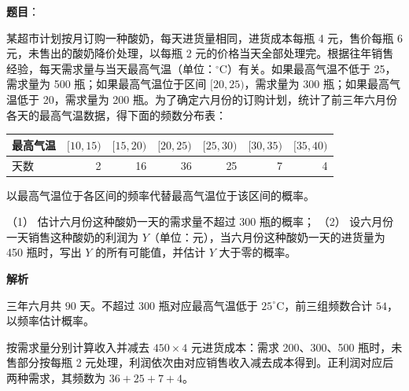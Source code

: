 \begin{answer}

\textbf{题目}：

某超市计划按月订购一种酸奶，每天进货量相同，进货成本每瓶 4 元，售价每瓶 6 元，未售出的酸奶降价处理，以每瓶 2 元的价格当天全部处理完。根据往年销售经验，每天需求量与当天最高气温（单位：\(^\circ\mathrm C\)）有关。如果最高气温不低于 25，需求量为 500 瓶；如果最高气温位于区间 \([20,25)\)，需求量为 300 瓶；如果最高气温低于 20，需求量为 200 瓶。为了确定六月份的订购计划，统计了前三年六月份各天的最高气温数据，得下面的频数分布表：

\begin{center}
\begin{tabular}{lrrrrrr}
\toprule
最高气温 & \([10,15)\) & \([15,20)\) & \([20,25)\) & \([25,30)\) & \([30,35)\) & \([35,40)\) \\
\midrule
天数 & 2 & 16 & 36 & 25 & 7 & 4 \\
\bottomrule
\end{tabular}
\end{center}

以最高气温位于各区间的频率代替最高气温位于该区间的概率。

（1） 估计六月份这种酸奶一天的需求量不超过 300 瓶的概率；
（2） 设六月份一天销售这种酸奶的利润为 \(Y\)（单位：元），当六月份这种酸奶一天的进货量为 450 瓶时，写出 \(Y\) 的所有可能值，并估计 \(Y\) 大于零的概率。

\textbf{解析}


三年六月共 \(90\) 天。不超过 300 瓶对应最高气温低于 \(25^\circ\mathrm C\)，前三组频数合计 \(54\)，以频率估计概率。


按需求量分别计算收入并减去 \(450\times4\) 元进货成本：需求 200、300、500 瓶时，未售部分按每瓶 2 元处理，利润依次由对应销售收入减去成本得到。正利润对应后两种需求，其频数为 \(36+25+7+4\)。



\end{answer}
